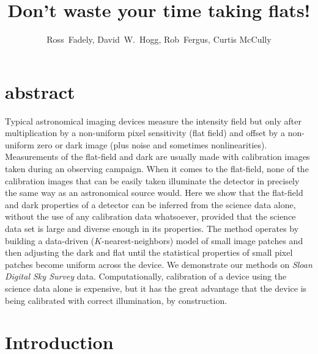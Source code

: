 \documentclass[12pt,preprint,pdftex]{aastex}
\newcommand{\project}[1]{\textsl{#1}}
\begin{document}
\sloppy\sloppypar

  
  \title{Don't waste your time taking flats!}
\author{
  Ross~Fadely,
  David~W.~Hogg,
  Rob~Fergus,
  Curtis McCully
}


\section{abstract}
Typical astronomical imaging devices measure the intensity field but
only after multiplication by a non-uniform pixel sensitivity (flat
field) and offset by a non-uniform zero or dark image (plus noise and
sometimes nonlinearities).  Measurements of the flat-field and dark
are usually made with calibration images taken during an observing
campaign.  When it comes to the flat-field, none of the calibration
images that can be easily taken illuminate the detector in precisely
the same way as an astronomical source would.  Here we show that the
flat-field and dark properties of a detector can be inferred from the
science data alone, without the use of any calibration data
whatsoever, provided that the science data set is large and diverse
enough in its properties.  The method operates by building a
data-driven ($K$-nearest-neighbors) model of small image patches and
then adjusting the dark and flat until the statistical properties of
small pixel patches become uniform across the device.  We demonstrate
our methods on \project{Sloan Digital Sky Survey} data.
Computationally, calibration of a device using the science data alone
is expensive, but it has the great advantage that the device is being
calibrated with correct illumination, by construction.

\section{Introduction}
\end{document}

